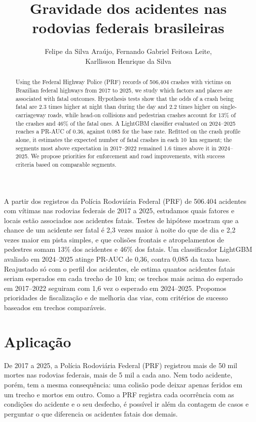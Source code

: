 \documentclass[12pt]{article}
\title{Gravidade dos acidentes nas rodovias federais brasileiras}
\author{Felipe da Silva Araújo\inst{1}, Fernando Gabriel Feitosa Leite\inst{1},\\
  Karllisson Henrique da Silva\inst{1}}
\begin{document}
\maketitle

\begin{abstract}
  Using the Federal Highway Police (PRF) records of 506,404 crashes with victims on Brazilian federal highways from 2017 to 2025, we study which factors and places are associated with fatal outcomes. Hypothesis tests show that the odds of a crash being fatal are 2.3 times higher at night than during the day and 2.2 times higher on single-carriageway roads, while head-on collisions and pedestrian crashes account for 13\% of the crashes and 46\% of the fatal ones. A LightGBM classifier evaluated on 2024--2025 reaches a PR-AUC of 0.36, against 0.085 for the base rate. Refitted on the crash profile alone, it estimates the expected number of fatal crashes in each 10~km segment; the segments most above expectation in 2017--2022 remained 1.6 times above it in 2024--2025. We propose priorities for enforcement and road improvements, with success criteria based on comparable segments.
\end{abstract}

\begin{resumo}
  A partir dos registros da Polícia Rodoviária Federal (PRF) de 506.404 acidentes com vítimas nas rodovias federais de 2017 a 2025, estudamos quais fatores e locais estão associados aos acidentes fatais. Testes de hipótese mostram que a chance de um acidente ser fatal é 2,3 vezes maior à noite do que de dia e 2,2 vezes maior em pista simples, e que colisões frontais e atropelamentos de pedestres somam 13\% dos acidentes e 46\% dos fatais. Um classificador LightGBM avaliado em 2024--2025 atinge PR-AUC de 0,36, contra 0,085 da taxa base. Reajustado só com o perfil dos acidentes, ele estima quantos acidentes fatais seriam esperados em cada trecho de 10~km; os trechos mais acima do esperado em 2017--2022 seguiram com 1,6 vez o esperado em 2024--2025. Propomos prioridades de fiscalização e de melhoria das vias, com critérios de sucesso baseados em trechos comparáveis.
\end{resumo}

\section{Aplicação}

De 2017 a 2025, a Polícia Rodoviária Federal (PRF) registrou mais de 50 mil mortes nas rodovias federais, mais de 5 mil a cada ano. Nem todo acidente, porém, tem a mesma consequência: uma colisão pode deixar apenas feridos em um trecho e mortos em outro. Como a PRF registra cada ocorrência com as condições do acidente e o seu desfecho, é possível ir além da contagem de casos e perguntar o que diferencia os acidentes fatais dos demais.
\end{document}
